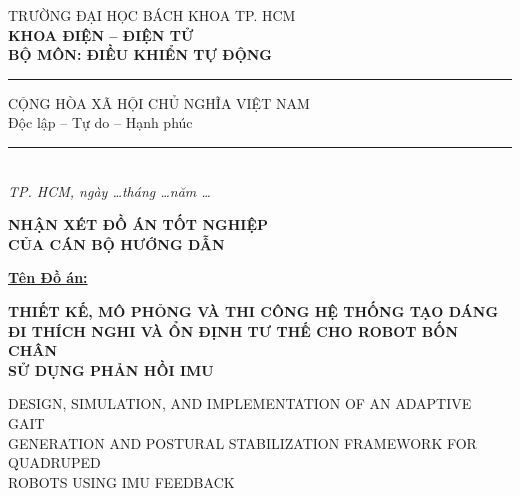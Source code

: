 \documentclass[12pt,a4paper]{article}
\begin{document}
\pagestyle{empty}

\noindent
\begin{minipage}[t]{0.48\textwidth}
    \centering
    {\small TRƯỜNG ĐẠI HỌC BÁCH KHOA TP. HCM} \\
    \textbf{KHOA ĐIỆN -- ĐIỆN TỬ} \\
    \textbf{BỘ MÔN: ĐIỀU KHIỂN TỰ ĐỘNG} \\
    \vspace{0.1cm}
    \rule{3.5cm}{0.5pt}
\end{minipage}
\hfill
\begin{minipage}[t]{0.48\textwidth}
    \centering
    {\small CỘNG HÒA XÃ HỘI CHỦ NGHĨA VIỆT NAM} \\
    {\small Độc lập -- Tự do -- Hạnh phúc} \\
    \vspace{0.1cm}
    \rule{4cm}{0.5pt} \\
    \vspace{0.2cm}
    \textit{\small TP. HCM, ngày \dots tháng \dots năm \dots}
\end{minipage}

\vspace{0.5cm}

\begin{center}
    {\large \textbf{NHẬN XÉT ĐỒ ÁN TỐT NGHIỆP}} \\[0.1cm]
    {\large \textbf{CỦA CÁN BỘ HƯỚNG DẪN}}
\end{center}

\vspace{0.2cm}

\noindent \underline{\textbf{Tên Đồ án:}}

\vspace{0.2cm}

\begin{center}
    {\large \textbf{THIẾT KẾ, MÔ PHỎNG VÀ THI CÔNG HỆ THỐNG TẠO DÁNG \\
    ĐI THÍCH NGHI VÀ ỔN ĐỊNH TƯ THẾ CHO ROBOT BỐN CHÂN \\
    SỬ DỤNG PHẢN HỒI IMU}}
    
    \vspace{0.1cm}
    {\small DESIGN, SIMULATION, AND IMPLEMENTATION OF AN ADAPTIVE GAIT \\
    GENERATION AND POSTURAL STABILIZATION FRAMEWORK FOR QUADRUPED \\
    ROBOTS USING IMU FEEDBACK}
\end{center}
\end{document}
